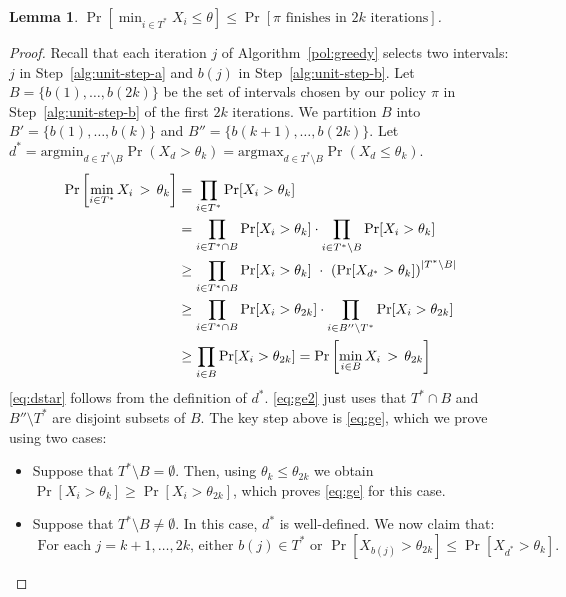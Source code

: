 \documentclass[11pt]{article}
\newcommand{\argmin}{\text{argmin}}
\newcommand{\argmax}{\text{argmax}}
\newtheorem{lem}[thm]{Lemma}
\theoremstyle{remark}
\theoremstyle{plain}
\theoremstyle{remark}
\begin{document}
\noindent
\begin{lem} 
\label{lem:lbalg} $\Pr\left[\min_{i \in T^*} X_i  \le  \theta\right] \leq \Pr[\pi \text{ finishes in }2k \text{ iterations}] $. \end{lem}

\begin{proof} Recall that each iteration $j$ of Algorithm~\ref{pol:greedy} selects two intervals: $j$ in Step~\ref{alg:unit-step-a} and $b(j)$ in Step~\ref{alg:unit-step-b}. 
Let $B = \{b(1),\dots, b(2k)\}$ be the set of intervals chosen by our policy $\pi$ in Step~\ref{alg:unit-step-b} of the first $2k$ iterations. We partition $B$ into  $B'=\{b(1),\dots, b(k)\}$ and $B''=\{b(k+1),\dots, b(2k)\}$. 
Let $d^* = \argmin_{d \in T^* \setminus B} \Pr(X_d > \theta_k)= \argmax_{d \in T^* \setminus B} \Pr(X_d \le \theta_k)$.
\begin{align}
   \Pr\left[\min_{i \in T^*} X_i \, >\, \theta_k\right]  & =  \prod_{i \in T^*} {\Pr[X_i > \theta_k]} \notag \\
   & =  \prod_{i \in T^* \cap B}  \Pr[X_i > \theta_{k}]  \cdot \prod_{i \in  T^* \setminus B} \Pr[X_i > \theta_{k}]  \notag \\
& \ge  \prod_{i \in T^* \cap B} \Pr[X_i  > \theta_{k}] \,\, \cdot\,\, 
\left({\Pr[X_{d^*} > \theta_{k}]}\right)^{|T^* \setminus B|} \label{eq:dstar} \\
   & \ge  \prod_{i \in T^* \cap B} \Pr[X_i > \theta_{2k}]  \cdot \prod_{i \in  B'' \setminus T^*} \Pr[X_i > \theta_{2k}] \label{eq:ge} \\ 
    & \ge \prod_{i \in  B} \Pr[X_i > \theta_{2k}]  = \Pr\left[\min_{i \in B}  X_i \, >\, \theta_{2k}\right]  \label{eq:ge2}
      \end{align}
\eqref{eq:dstar} follows from the definition of $d^*$. \eqref{eq:ge2} just uses that $T^* \cap B$ and $ B'' \setminus T^*$ are disjoint subsets of $B$. The key step above is \eqref{eq:ge}, which we prove using two cases:
\begin{itemize}
    \item Suppose that $T^* \setminus  B = \emptyset$. Then, using   $\theta_k \leq \theta_{2k}$ we obtain $\Pr[X_i > \theta_{k}]\ge \Pr[X_i > \theta_{2k}]$,  which proves  \eqref{eq:ge} for this case.
    \item Suppose that $T^* \setminus  B \ne \emptyset$. In this case, $d^*$ is well-defined. We now claim that: 
    \begin{equation}\label{eq:claim-index-dom}
        \mbox{  For each $j=k+1,\dots, 2k$,     either } b(j)\in T^* \mbox{ or } \Pr[X_{b(j)} > \theta_{2k}] \leq \Pr[X_{d^*} > \theta_{k}]. 
    \end{equation}


\end{itemize}
\end{proof}
\end{document}
